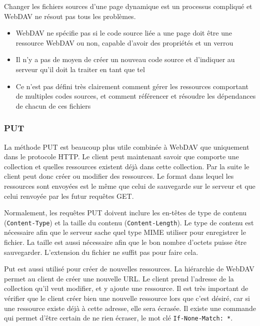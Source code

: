 \documentclass[a4paper, 11pt]{article}
\begin{document}
{			Changer les fichiers sources d'une page dynamique est un processus compliqué et WebDAV ne résout pas tous les problèmes.
			
				\begin{itemize}
					\item WebDAV ne spécifie pas si le code source liée a une page doit être une ressource WebDAV ou non, capable d'avoir des propriétés et un verrou
					\item Il n'y a pas de moyen de créer un nouveau code source et d'indiquer au serveur qu'il doit la traiter en tant que tel
					\item Ce n'est pas défini très clairement comment gérer les ressources comportant de multiples codes sources, et comment référencer et résoudre les dépendances de chacun de ces fichiers
				\end{itemize}
				
		
		\subsubsection{PUT}
		
			La méthode PUT est beaucoup plus utile combinée à WebDAV que uniquement dans le protocole HTTP. Le client peut maintenant savoir que comporte une collection et quelles ressources existent déjà dans cette collection. Par la suite le client peut donc créer ou modifier des ressources. Le format dans lequel les ressources sont envoyées est le même que celui de sauvegarde sur le serveur et que celui renvoyée par les futur requêtes GET. 
			
			Normalement, les requêtes PUT doivent inclure les en-têtes de type de contenu (\texttt{Content-Type}) et la taille du contenu (\texttt{Content-Length}). Le type de contenu est nécessaire afin que le serveur sache quel type MIME utiliser pour enregistrer le fichier. La taille est aussi nécessaire afin que le bon nombre d'octets puisse être sauvegarder. L'extension du fichier ne suffit pas pour faire cela.
		 
			Put est aussi utilisé pour créer de nouvelles ressources. La hiérarchie de WebDAV permet au client de créer une nouvelle URL. Le client prend l'adresse de la collection qu'il veut modifier, et y ajoute une ressource. Il est très important de vérifier que le client créer bien une nouvelle ressource lors que c'est désiré, car si une ressource existe déjà à cette adresse, elle sera écrasée. Il existe une commande qui permet d'être certain de ne rien écraser, le mot clé \texttt{If-None-Match: *}.
			
}
\end{document}
